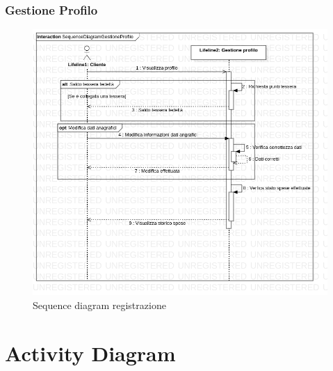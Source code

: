 \documentclass[12pt, a4paper]{article}
\numberwithin{equation}{section} %
\begin{document}
\subsubsection{Gestione Profilo}

\begin{figure}[h]
\centering
\includegraphics[width=\textwidth]{Use Case Model!Gestione profilo!InteractionGestioneProfilo!SequenceDiagramGestioneProfilo_5.png}
\caption{Sequence diagram registrazione}
\end{figure}

\section{Activity Diagram}
\end{document}
